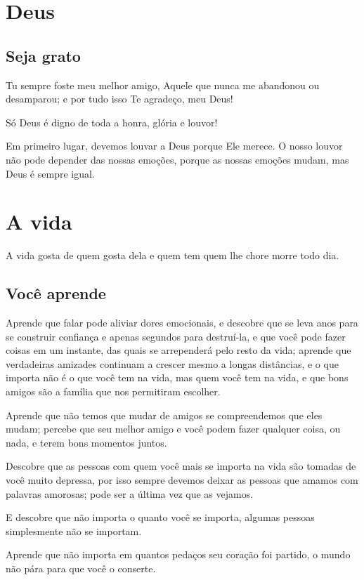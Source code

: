 
\anexo
\chapter{Deus}

\section{Seja grato}
Tu sempre foste meu melhor amigo, Aquele que nunca me abandonou 
ou desamparou; e por tudo isso Te agradeço, meu Deus!


Só Deus é digno de toda a honra, glória e louvor!

Em primeiro lugar, devemos louvar a Deus porque Ele merece. O nosso louvor não pode depender das nossas emoções, porque as nossas emoções mudam, mas Deus é sempre igual.


\chapter{A vida}

A vida gosta de quem gosta dela e quem tem quem lhe chore morre todo dia.

\section{Você aprende}

Aprende que falar pode aliviar dores emocionais, e descobre que se leva anos para se construir confiança e apenas segundos para destruí-la, e que você pode fazer coisas em um instante, das quais se arrependerá pelo resto da vida; aprende que verdadeiras amizades continuam a crescer mesmo a longas distâncias, e o que importa não é o que você tem na vida, mas quem você tem na vida, e que bons amigos são a família que nos permitiram escolher.

Aprende que não temos que mudar de amigos se compreendemos que eles mudam; percebe que seu melhor amigo e você podem fazer qualquer coisa, ou nada, e terem bons momentos juntos.

Descobre que as pessoas com quem você mais se importa na vida são tomadas de você muito depressa, por isso sempre devemos deixar as pessoas que amamos com palavras amorosas; pode ser a última vez que as vejamos.

E descobre que não importa o quanto você se importa, algumas pessoas simplesmente não se importam.

Aprende que não importa em quantos pedaços seu coração foi partido, o mundo não pára para que você o conserte.

